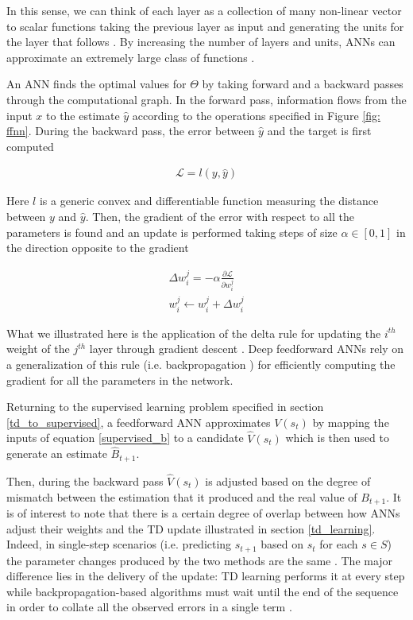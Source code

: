 In this sense, we can think of each layer as a collection of many non-linear vector to scalar functions taking the previous layer as input and generating the units for the layer that follows \cite{bengio2017deep}. By increasing the number of layers and units, ANNs can approximate an extremely large class of functions \cite{rumelhart1986learning}.



An ANN finds the optimal values for $\Theta$ by taking forward and a backward passes through the computational graph. In the forward pass, information flows from the input $x$ to the estimate $\widehat{y}$ according to the operations specified in Figure \ref{fig: ffnn}. During the backward pass, the error between $\widehat{y}$ and the target is first computed

\begin{gather}
\label{loss}
    \mathcal{L} = l(y, \widehat{y})
\end{gather}

Here $l$ is a generic convex and differentiable function measuring the distance between $y$ and $\widehat{y}$. Then, the gradient of the error with respect to all the parameters is found and an update is performed taking steps of size $\alpha \in [0, 1]$ in the direction opposite to the gradient

\begin{gather}
\label{delta_rule}
    \Delta w^{j}_{i} = -\alpha\frac{\partial \mathcal{L}}{\partial w^{j}_{i}} \\
    w^{j}_{i} \leftarrow w^{j}_{i} + \Delta w^{j}_{i} \nonumber
\end{gather}

What we illustrated here is the application of the delta rule for updating the $i^{th}$ weight of the $j^{th}$ layer through gradient descent \cite{widrow1960adaptive}. Deep feedforward ANNs rely on a generalization of this rule (i.e. backpropagation \cite{rumelhart1986learning}) for efficiently computing the gradient for all the parameters in the network.  

Returning to the supervised learning problem specified in section \ref{td_to_supervised}, a feedforward ANN approximates $V(s_{t})$ by mapping the inputs of equation \ref{supervised_b} to a candidate $\widehat{V}(s_{t})$ which is then used to generate an estimate $\widehat{B}_{t+1}$. 

Then, during the backward pass $\widehat{V}(s_{t})$ is adjusted based on the degree of mismatch between the estimation that it produced and the real value of $B_{t+1}$. It is of interest to note that there is a certain degree of overlap between how ANNs adjust their weights and the TD update illustrated in section \ref{td_learning}. Indeed, in single-step scenarios (i.e. predicting $s_{t+1}$ based on $s_{t}$ for each $s \in S$) the parameter changes produced by the two methods are the same \cite{sutton1988learning}. The major difference lies in the delivery of the update: TD learning performs it at every step while backpropagation-based algorithms must  wait until the end of the sequence in order to collate all the observed errors in a single term \cite{sutton1988learning}.

